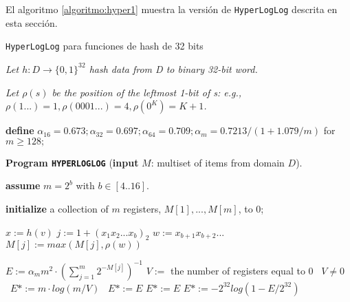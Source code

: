 El algoritmo \ref{algoritmo:hyper1} muestra la versión de \texttt{HyperLogLog} descrita en esta sección.

\begin{algorithm}[h!]
\caption{\texttt{HyperLogLog} para funciones de hash de 32 bits}
\label{algoritmo:hyper1}
\textit{Let $h: D\rightarrow \{0,1\}^{32}$ hash data from D to binary 32-bit word.}

\textit{Let $\rho(s)$ be the position of the leftmost 1-bit of s: e.g.,
$\rho(1...) = 1, \rho(0001...) = 4, \rho(0^K) = K + 1$.}

\textbf{define} $\alpha_{16}=0.673;\alpha_{32}=0.697;\alpha_{64}=0.709;\alpha_m=0.7213/(1+1.079/m)$
for $m \geq 128;$

\textbf{Program \texttt{HYPERLOGLOG}} (\textbf{input} $M$: multiset of items from domain $D$).

\textbf{assume} $m=2^b$ with $ b\in[4..16]$.

\textbf{initialize} a collection of $m$ registers, $M[1],...,M[m]$, to 0;

\begin{algorithmic}
            \STATE $x  := h(v)$
            \STATE $j   := 1 + (x_1 x_2 ... x_b)_2$ 
            \STATE $w := x_{b+1} x_{b+2} ... $
            \STATE $M[j] := max(M[j],\rho(w))$
    \ENDFOR

    \STATE $E:=\alpha _m m^2·\left(\sum\limits_{j=1}^m 2^{-M[j]}\right)^{-1}$ 
        \STATE $V :=$ the number of registers equal to $0$
        \STATE \algorithmicif\ $V \neq 0$ \algorithmicthen\ $E* := m \cdot log(m / V)$ \algorithmicelse\ $E* := E$
    \ENDIF
        \STATE $E*:=E$ 
    \ELSE
        \STATE $E* := -2^{32}log(1-E/2^{32})$ 
    \ENDIF
\end{algorithmic}
\end{algorithm}

